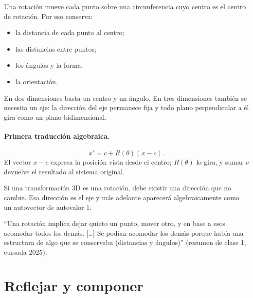 {\small\vspace{1mm}\par}


Una rotación mueve cada punto sobre una circunferencia cuyo centro es el centro de rotación.
Por eso conserva:
\begin{itemize}
  \item la distancia de cada punto al centro;
  \item las distancias entre puntos;
  \item los ángulos y la forma;
  \item la orientación.
\end{itemize}

En dos dimensiones basta un centro y un ángulo. En tres dimensiones también se necesita un
eje: la dirección del eje permanece fija y todo plano perpendicular a él gira como un plano
bidimensional.

\paragraph{Primera traducción algebraica.}
\[
  x'=c+R(\theta)(x-c).
\]
El vector \(x-c\) expresa la posición vista desde el centro; \(R(\theta)\) lo gira, y sumar
\(c\) devuelve el resultado al sistema original.

\begin{resultado}
Si una transformación 3D es una rotación, debe existir una dirección que no cambie. Esa
dirección es el eje y más adelante aparecerá algebraicamente como un autovector de autovalor
\(1\).
\end{resultado}

\begin{idea}
``Una rotación implica dejar quieto un punto, mover otro, y en base a esos acomodar todos
los demás. [\ldots] Se podían acomodar los demás porque había una estructura de algo que
se conservaba (distancias y ángulos)'' (resumen de clase 1, cursada 2025).
\end{idea}

\section{Reflejar y componer}\label{sec:reflejar}

{\small\vspace{1mm}\par}


